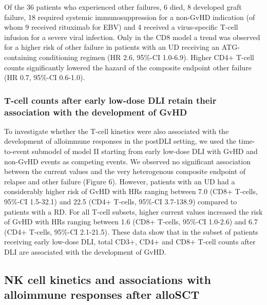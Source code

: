 \documentclass[
  letterpaper,
  DIV=11,
  numbers=noendperiod]{scrreprt}
\begin{document}
Of the 36 patients who experienced other failures, 6 died, 8 developed
graft failure, 18 required systemic immunosuppression for a non-GvHD
indication (of whom 9 received rituximab for EBV) and 4 received a
virus-specific T-cell infusion for a severe viral infection. Only in the
CD8 model a trend was observed for a higher risk of other failure in
patients with an UD receiving an ATG-containing conditioning regimen (HR
2.6, 95\%-CI 1.0-6.9). Higher CD4+ T-cell counts significantly lowered
the hazard of the composite endpoint other failure (HR 0.7, 95\%-CI
0.6-1.0).

\hypertarget{t-cell-counts-after-early-low-dose-dli-retain-their-association-with-the-development-of-gvhd}{%
\subsubsection{T-cell counts after early low-dose DLI retain their
association with the development of
GvHD}\label{t-cell-counts-after-early-low-dose-dli-retain-their-association-with-the-development-of-gvhd}}

To investigate whether the T-cell kinetics were also associated with the
development of alloimmune responses in the postDLI setting, we used the
time-to-event submodel of model II starting from early low-dose DLI with
GvHD and non-GvHD events as competing events. We observed no significant
association between the current values and the very heterogenous
composite endpoint of relapse and other failure (Figure 6). However,
patients with an UD had a considerably higher risk of GvHD with HRs
ranging between 7.0 (CD8+ T-cells, 95\%-CI 1.5-32.1) and 22.5 (CD4+
T-cells, 95\%-CI 3.7-138.9) compared to patients with a RD. For all
T-cell subsets, higher current values increased the risk of GvHD with
HRs ranging between 1.6 (CD8+ T-cells, 95\%-CI 1.0-2.6) and 6.7 (CD4+
T-cells, 95\%-CI 2.1-21.5). These data show that in the subset of
patients receiving early low-dose DLI, total CD3+, CD4+ and CD8+ T-cell
counts after DLI are associated with the development of GvHD.

\hypertarget{nk-cell-kinetics-and-associations-with-alloimmune-responses-after-allosct}{%
\subsection{NK cell kinetics and associations with alloimmune responses
after
alloSCT}\label{nk-cell-kinetics-and-associations-with-alloimmune-responses-after-allosct}}
\end{document}
